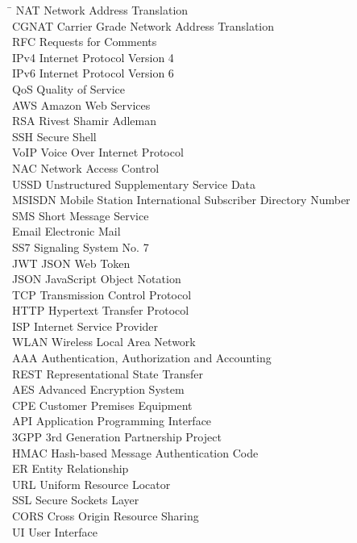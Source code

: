 \documentclass[12pt,a4paper,oneside]{report}
\begin{document}
\begin{tabbing}
  \hspace{3cm} \= \kill
  NAT       \> Network Address Translation \\
  CGNAT     \> Carrier Grade Network Address Translation \\
  RFC       \> Requests for Comments \\
  IPv4      \> Internet Protocol Version 4 \\
  IPv6      \> Internet Protocol Version 6 \\
  QoS       \> Quality of Service \\
  AWS       \> Amazon Web Services \\
  RSA       \> Rivest Shamir Adleman \\
  SSH       \> Secure Shell \\
  VoIP      \> Voice Over Internet Protocol \\
  NAC       \> Network Access Control \\
  USSD      \> Unstructured Supplementary Service Data \\
  MSISDN    \> Mobile Station International Subscriber Directory Number \\
  SMS       \> Short Message Service \\
  Email     \> Electronic Mail \\
  SS7       \> Signaling System No. 7 \\
  JWT       \> JSON Web Token \\
  JSON      \> JavaScript Object Notation \\
  TCP       \> Transmission Control Protocol \\
  HTTP      \> Hypertext Transfer Protocol \\
  ISP       \> Internet Service Provider \\
  WLAN      \> Wireless Local Area Network \\
  AAA       \> Authentication, Authorization and Accounting \\
  REST      \> Representational State Transfer \\
  AES       \> Advanced Encryption System \\
  CPE       \> Customer Premises Equipment \\
  API       \> Application Programming Interface \\
  3GPP      \> 3rd Generation Partnership Project \\
  HMAC      \> Hash-based Message Authentication Code \\
  ER        \> Entity Relationship \\
  URL       \> Uniform Resource Locator \\
  SSL       \> Secure Sockets Layer \\
  CORS      \> Cross Origin Resource Sharing \\
  UI        \> User Interface \\
\end{tabbing}
\end{document}
